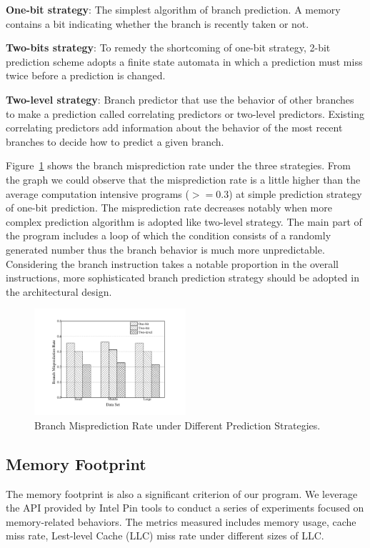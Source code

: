 \begin{compactitem}
\item \textbf{One-bit strategy}: The simplest algorithm of branch prediction. A memory contains a bit indicating whether the branch is recently taken or not.
\item \textbf{Two-bits strategy}: To remedy the shortcoming of one-bit strategy, 2-bit prediction scheme adopts a finite state automata in which a prediction must miss twice before a prediction is changed.
\item \textbf{Two-level strategy}: Branch predictor that use the behavior of other branches to make a prediction called correlating predictors or two-level predictors. Existing correlating predictors add information about the behavior of the most recent branches to decide how to predict a given branch\cite{John:2006,Ribas:2006}.
\end{compactitem}
Figure~\ref{fig:predict} shows the branch misprediction rate under the three strategies. From the graph we could observe that the misprediction rate is a little higher than the average computation intensive programs ($>=0.3$) at simple prediction strategy of one-bit prediction. The misprediction rate decreases notably when more complex prediction algorithm is adopted like two-level strategy. The main part of the program includes a loop of which the condition consists of a randomly generated number thus the branch behavior is much more unpredictable. Considering the branch instruction takes a notable proportion in the overall instructions, more sophisticated branch prediction strategy should be adopted in the architectural design. 

\begin{figure}
\centering
\includegraphics[width=0.50\textwidth]{graph/predict.pdf}
\caption{Branch Misprediction Rate under Different Prediction Strategies.}
\label{fig:predict}
\end{figure}

\subsection{Memory Footprint}
\label{sec:memory}
The memory footprint is also a significant criterion of our program. We leverage the API provided by Intel Pin tools to conduct a series of experiments focused on memory-related behaviors. The metrics measured includes memory usage, cache miss rate, Lest-level Cache (LLC) miss rate under different sizes of LLC.

